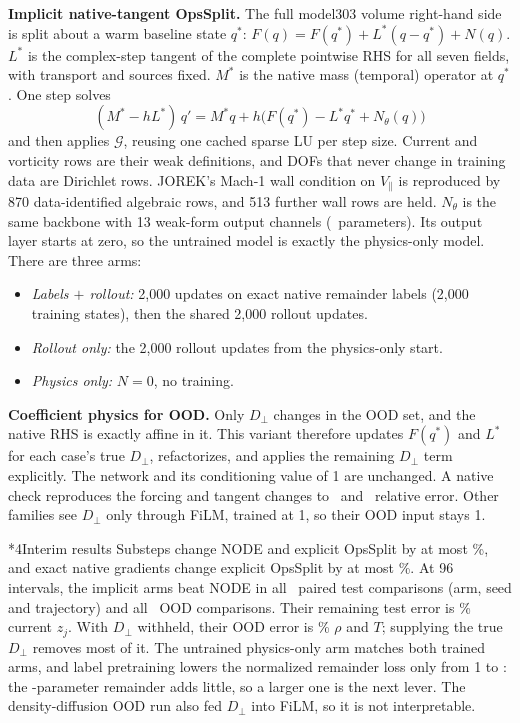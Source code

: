 \documentclass[10pt,letterpaper,twocolumn]{article}
\makeatletter
\renewcommand\section{\@startsection{section}{1}{0pt}{8pt}{4pt}{\normalfont\fontsize{11}{13}\bfseries}}
\makeatother
\begin{document}
\textbf{Implicit native-tangent OpsSplit.} The full model303 volume right-hand side is split about a warm baseline state $q^*$:
$F(q)=F(q^*)+L^*(q-q^*)+N(q)$.
$L^*$ is the complex-step tangent of the complete pointwise RHS for all seven fields, with transport and sources fixed.
$M^*$ is the native mass (temporal) operator at $q^*$. One step solves
\begin{equation*}
(M^*-hL^*)\,q'=M^*q+h\big(F(q^*)-L^*q^*+N_\theta(q)\big)
\end{equation*}
and then applies $\mathcal G$, reusing one cached sparse LU per step size.
Current and vorticity rows are their weak definitions, and DOFs that never change in training data are Dirichlet rows.
JOREK's Mach-1 wall condition on $V_\parallel$ is reproduced by 870 data-identified algebraic rows, and 513 further wall rows are held.
$N_\theta$ is the same backbone with 13 weak-form output channels (\ParamsImplicit\ parameters).
Its output layer starts at zero, so the untrained model is exactly the physics-only model. There are three arms:
\begin{itemize}[leftmargin=10pt,itemsep=0pt,topsep=2pt,parsep=0pt]
\item \emph{Labels $+$ rollout:} 2,000 updates on exact native remainder labels (2,000 training states), then the shared 2,000 rollout updates.
\item \emph{Rollout only:} the 2,000 rollout updates from the physics-only start.
\item \emph{Physics only:} $N=0$, no training.
\end{itemize}

\textbf{Coefficient physics for OOD.} Only $D_\perp$ changes in the OOD set, and the native RHS is exactly affine in it.
This variant therefore updates $F(q^*)$ and $L^*$ for each case's true $D_\perp$, refactorizes, and applies the remaining $D_\perp$ term explicitly.
The network and its conditioning value of 1 are unchanged.
A native check reproduces the forcing and tangent changes to \CoefForcing\ and \CoefTangent\ relative error.
Other families see $D_\perp$ only through FiLM, trained at 1, so their OOD input stays 1.


\section*{4\quad Interim results}
Substeps change NODE and explicit OpsSplit by at most \SubstepChange\%, and exact native gradients change explicit OpsSplit by at most \GradientChange\%.
At 96 intervals, the implicit arms beat NODE in all \PairedTotal\ paired test comparisons (arm, seed and trajectory) and all \OodPairedTotal\ OOD comparisons.
Their remaining test error is \TestCurrentShare\% current $z_j$.
With $D_\perp$ withheld, their OOD error is \OodDensityShare\% $\rho$ and $T$; supplying the true $D_\perp$ removes most of it.
The untrained physics-only arm matches both trained arms, and label pretraining lowers the normalized remainder loss only from 1 to \PretrainLoss: the \ParamsImplicit-parameter remainder adds little, so a larger one is the next lever.
The density-diffusion OOD run also fed $D_\perp$ into FiLM, so it is not interpretable.
\end{document}
